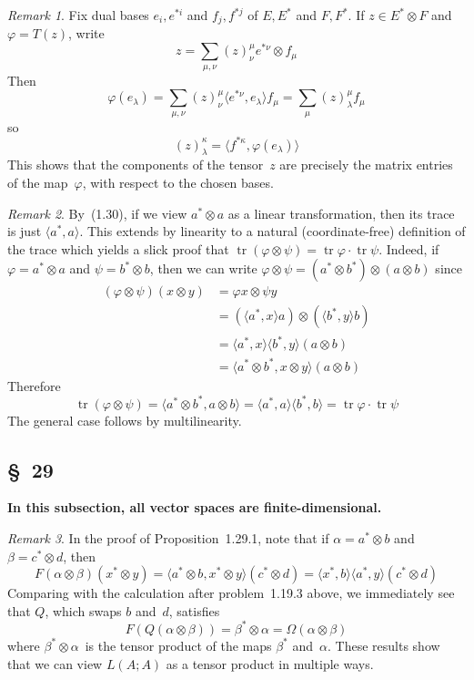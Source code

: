 \documentclass[letterpaper,12pt]{article}
\DeclareMathOperator{\tr}{tr}
\newcommand{\mult}{\cdot}
\newcommand{\tprod}{\otimes}
\newcommand{\sprod}[2]{\langle#1,#2\rangle}
\theoremstyle{definition}
\theoremstyle{remark}
\newtheorem*{rmk}{Remark}
\begin{document}
\begin{rmk}
Fix dual bases \(e_i,e^{*i}\) and \(f_j,f^{*j}\) of \(E,E^*\) and \(F,F^*\). If \(z\in E^*\tprod F\) and \(\varphi=T(z)\), write
\[z=\sum_{\mu,\nu}(z)^{\mu}_{\nu}e^{*\nu}\tprod f_{\mu}\]
Then
\[\varphi(e_{\lambda})=\sum_{\mu,\nu}(z)^{\mu}_{\nu}\sprod{e^{*\nu}}{e_{\lambda}}f_{\mu}=\sum_{\mu}(z)^{\mu}_{\lambda}f_{\mu}\]
so
\[(z)^{\kappa}_{\lambda}=\sprod{f^{*\kappa}}{\varphi(e_{\lambda})}\]
This shows that the components of the tensor~\(z\) are precisely the matrix entries of the map~\(\varphi\), with respect to the chosen bases.
\end{rmk}

\begin{rmk}
By~(1.30), if we view \(a^*\tprod a\) as a linear transformation, then its trace is just \(\sprod{a^*}{a}\). This extends by linearity to a natural (coordinate-free) definition of the trace which yields a slick proof that \(\tr(\varphi\tprod\psi)=\tr\varphi\mult\tr\psi\). Indeed, if \(\varphi=a^*\tprod a\) and \(\psi=b^*\tprod b\), then we can write \(\varphi\tprod\psi=(a^*\tprod b^*)\tprod(a\tprod b)\) since
\begin{align*}
(\varphi\tprod\psi)(x\tprod y)&=\varphi x\tprod\psi y\\
	&=(\sprod{a^*}{x}a)\tprod(\sprod{b^*}{y}b)\\
	&=\sprod{a^*}{x}\sprod{b^*}{y}(a\tprod b)\\
	&=\sprod{a^*\tprod b^*}{x\tprod y}(a\tprod b)
\end{align*}
Therefore
\[\tr(\varphi\tprod\psi)=\sprod{a^*\tprod b^*}{a\tprod b}=\sprod{a^*}{a}\sprod{b^*}{b}=\tr\varphi\mult\tr\psi\]
The general case follows by multilinearity.
\end{rmk}

\subsection*{\S~29}
\textbf{In this subsection, all vector spaces are finite-dimensional.}

\begin{rmk}
In the proof of Proposition~1.29.1, note that if \(\alpha=a^*\tprod b\) and \(\beta=c^*\tprod d\), then
\[F(\alpha\tprod\beta)(x^*\tprod y)=\sprod{a^*\tprod b}{x^*\tprod y}(c^*\tprod d)=\sprod{x^*}{b}\sprod{a^*}{y}(c^*\tprod d)\]
Comparing with the calculation after problem~1.19.3 above, we immediately see that \(Q\), which swaps \(b\) and~\(d\), satisfies
\[F(Q(\alpha\tprod\beta))=\beta^*\tprod\alpha=\Omega(\alpha\tprod\beta)\]
where \(\beta^*\tprod\alpha\)~is the tensor product of the maps \(\beta^*\) and~\(\alpha\). These results show that we can view \(L(A;A)\) as a tensor product in multiple ways.
\end{rmk}
\end{document}
